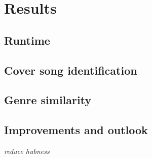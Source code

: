
\chapter{Results}

\section{Runtime}

\section{Cover song identification}

\section{Genre similarity}

\section{Improvements and outlook}

\textit{reduce hubness}


